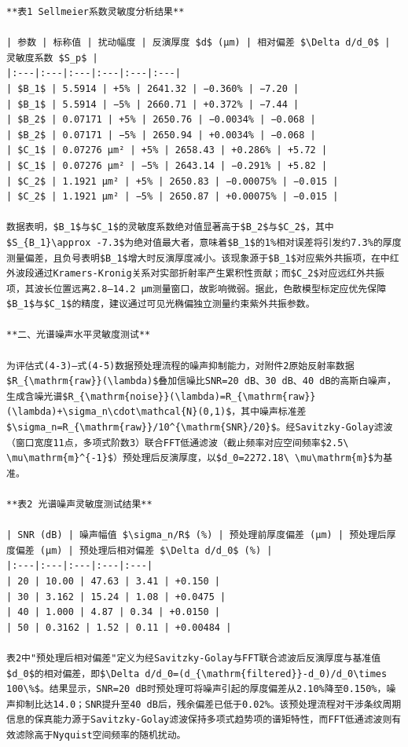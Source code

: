 \documentclass{mcmthesis}
\begin{document}
\begin{table}[htbp]
\begin{lstlisting}
**表1 Sellmeier系数灵敏度分析结果**

| 参数 | 标称值 | 扰动幅度 | 反演厚度 $d$ (μm) | 相对偏差 $\Delta d/d_0$ | 灵敏度系数 $S_p$ |
|:---|:---|:---|:---|:---|:---|
| $B_1$ | 5.5914 | +5% | 2641.32 | −0.360% | −7.20 |
| $B_1$ | 5.5914 | −5% | 2660.71 | +0.372% | −7.44 |
| $B_2$ | 0.07171 | +5% | 2650.76 | −0.0034% | −0.068 |
| $B_2$ | 0.07171 | −5% | 2650.94 | +0.0034% | −0.068 |
| $C_1$ | 0.07276 μm² | +5% | 2658.43 | +0.286% | +5.72 |
| $C_1$ | 0.07276 μm² | −5% | 2643.14 | −0.291% | +5.82 |
| $C_2$ | 1.1921 μm² | +5% | 2650.83 | −0.00075% | −0.015 |
| $C_2$ | 1.1921 μm² | −5% | 2650.87 | +0.00075% | −0.015 |

数据表明，$B_1$与$C_1$的灵敏度系数绝对值显著高于$B_2$与$C_2$，其中$S_{B_1}\approx -7.3$为绝对值最大者，意味着$B_1$的1%相对误差将引发约7.3%的厚度测量偏差，且负号表明$B_1$增大时反演厚度减小。该现象源于$B_1$对应紫外共振项，在中红外波段通过Kramers-Kronig关系对实部折射率产生累积性贡献；而$C_2$对应远红外共振项，其波长位置远离2.8–14.2 μm测量窗口，故影响微弱。据此，色散模型标定应优先保障$B_1$与$C_1$的精度，建议通过可见光椭偏独立测量约束紫外共振参数。

**二、光谱噪声水平灵敏度测试**

为评估式(4-3)–式(4-5)数据预处理流程的噪声抑制能力，对附件2原始反射率数据$R_{\mathrm{raw}}(\lambda)$叠加信噪比SNR=20 dB、30 dB、40 dB的高斯白噪声，生成含噪光谱$R_{\mathrm{noise}}(\lambda)=R_{\mathrm{raw}}(\lambda)+\sigma_n\cdot\mathcal{N}(0,1)$，其中噪声标准差$\sigma_n=R_{\mathrm{raw}}/10^{\mathrm{SNR}/20}$。经Savitzky-Golay滤波（窗口宽度11点，多项式阶数3）联合FFT低通滤波（截止频率对应空间频率$2.5\ \mu\mathrm{m}^{-1}$）预处理后反演厚度，以$d_0=2272.18\ \mu\mathrm{m}$为基准。

**表2 光谱噪声灵敏度测试结果**

| SNR (dB) | 噪声幅值 $\sigma_n/R$ (%) | 预处理前厚度偏差 (μm) | 预处理后厚度偏差 (μm) | 预处理后相对偏差 $\Delta d/d_0$ (%) |
|:---|:---|:---|:---|:---|
| 20 | 10.00 | 47.63 | 3.41 | +0.150 |
| 30 | 3.162 | 15.24 | 1.08 | +0.0475 |
| 40 | 1.000 | 4.87 | 0.34 | +0.0150 |
| 50 | 0.3162 | 1.52 | 0.11 | +0.00484 |

表2中"预处理后相对偏差"定义为经Savitzky-Golay与FFT联合滤波后反演厚度与基准值$d_0$的相对偏差，即$\Delta d/d_0=(d_{\mathrm{filtered}}-d_0)/d_0\times 100\%$。结果显示，SNR=20 dB时预处理可将噪声引起的厚度偏差从2.10%降至0.150%，噪声抑制比达14.0；SNR提升至40 dB后，残余偏差已低于0.02%。该预处理流程对干涉条纹周期信息的保真能力源于Savitzky-Golay滤波保持多项式趋势项的谱矩特性，而FFT低通滤波则有效滤除高于Nyquist空间频率的随机扰动。


\end{lstlisting}
\end{table}
\end{document}
